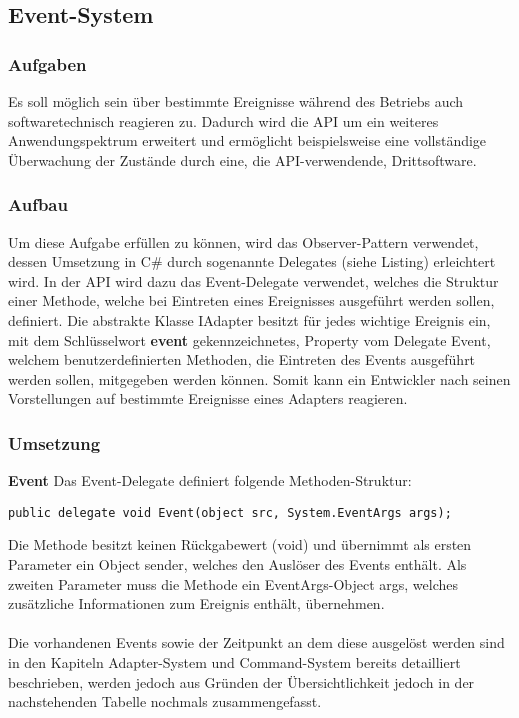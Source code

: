 
\subsection{Event-System}

\subsubsection{Aufgaben}
Es soll möglich sein über bestimmte Ereignisse während des Betriebs auch softwaretechnisch reagieren zu. Dadurch wird die API um ein weiteres Anwendungspektrum erweitert und ermöglicht beispielsweise eine vollständige Überwachung der Zustände durch eine, die API-verwendende, Drittsoftware.

\subsubsection{Aufbau}
Um diese Aufgabe erfüllen zu können, wird das Observer-Pattern verwendet, dessen Umsetzung in C\# durch sogenannte Delegates (siehe Listing) erleichtert wird. In der API wird dazu das Event-Delegate verwendet, welches die Struktur einer Methode, welche bei Eintreten eines Ereignisses ausgeführt werden sollen, definiert. 
\newline
Die abstrakte Klasse IAdapter besitzt für jedes wichtige Ereignis ein, mit dem Schlüsselwort \textbf{event} gekennzeichnetes, Property vom Delegate Event, welchem benutzerdefinierten Methoden, die Eintreten des Events ausgeführt werden sollen, mitgegeben werden können. Somit kann ein Entwickler nach seinen Vorstellungen auf bestimmte Ereignisse eines Adapters reagieren.

\subsubsection{Umsetzung}
\textbf{Event}
\newline
Das Event-Delegate definiert folgende Methoden-Struktur:

\begin{lstlisting}[language = CSharp, captionpos=b, caption={Das Event-Delegate}]
public delegate void Event(object src, System.EventArgs args);
\end{lstlisting}

Die Methode besitzt keinen Rückgabewert (void) und übernimmt als ersten Parameter ein Object sender, welches den Auslöser des Events enthält. Als zweiten Parameter muss die Methode ein EventArgs-Object args, welches zusätzliche Informationen zum Ereignis enthält, übernehmen.\\
\\
Die vorhandenen Events sowie der Zeitpunkt an dem diese ausgelöst werden sind in den Kapiteln Adapter-System und Command-System bereits detailliert beschrieben, werden jedoch aus Gründen der Übersichtlichkeit jedoch in der nachstehenden Tabelle nochmals zusammengefasst.


